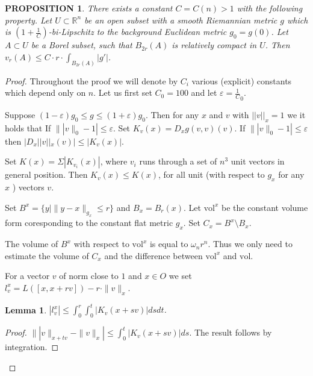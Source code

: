 \documentclass[12pt,leqno,intlimits]{amsart}
\numberwithin{equation}{section}
\newtheorem{lem}[thm]{Lemma}
\newtheorem{prop}[thm]{PROPOSITION}
\theoremstyle{definition}
\theoremstyle{remark}
\newcommand{\vol}{\mathrm{vol}}
\newcommand{\R}{\mathbb{R}}
\def\eps{\varepsilon}
\begin{document}
\begin{prop}\label{prop-smooth}
There exists a constant $C=C(n)>1$ with the following property.
Let $U\subset \R^n$ be an open subset with a smooth Riemannian
metric $g$ which is $(1+\frac 1 C)$-bi-Lipschitz to  the background Euclidean metric $g_0=g(0)$.
  Let $A\subset U$ be a Borel subset, such that $B_{2r} (A)$ is relatively compact in $U$.
Then  $v_r (A) \leq C \cdot r \cdot \int _{B_{2r} ( A)} |g' |$.
\end{prop}



 \begin{proof}
%
%
Throughout the proof we will denote by $C_i$ various (explicit) constants which depend only on $n$.
Let us first set $C_0=100$ and let $\eps=\frac 1 C_0$. 


Suppose $(1-\eps)g_0\le g\le (1+\eps)g_0$.  Then for any $x$ and $v$ with $||v||_x=1$ we it holds that  If $\||v\|_0 -1| \leq \eps$.
 Set $K_v (x) = D_x g(v,v) (v)$.   If $\||v\|_0 -1| \leq \eps$  then
$|D_x||v||_x(v)|\le |K_v (x)| $.


 Set $K(x)= \Sigma |K_{v_i}(x)|$, where $v_i$ runs through a set of $n^3$ unit vectors in general position.
 Then $K_v(x) \leq K (x)$, for all unit (with respect to   $g_x$ for any $x$ ) vectors $v$.

 Set $B^x = \{ y | \|y-x\| _{g_x} \leq r \}$ and $B_x = B_r (x)$.  Let $\vol ^x$ be the constant
 volume form coresponding to the constant flat metric $g_x$.
   Set $C_x = B^x \setminus B_x$.

   The volume of $B^x$ with respect to $\vol ^x$ is equal to $\omega_n r^n$. Thus we only need to estimate
  the volume of $C_x$ and the difference between $\vol ^x$ and $\vol$.

 For a vector $v$ of norm close to $1$ and $x\in O$ we set
 $l_v ^x = L ([x,x+rv]) - r \cdot \| v\| _x$.

 \begin{lem}
 $|l_v ^x| \leq \int _0 ^r  \int _0 ^t | K_v (x+sv)| ds dt$.
 \end{lem}


 \begin{proof}
 $\||v\|_{x+tv} -\|v\| _x| \leq \int _0 ^t  |K_v (x+sv)| ds$. The result follows by integration.
  \end{proof}



\end{proof}
\end{document}
